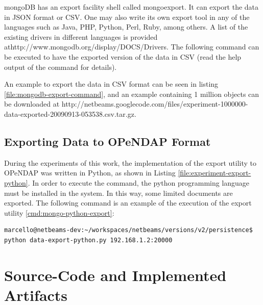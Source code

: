 mongoDB has an export facility shell called mongoexport. It can export the data
in JSON format or CSV. One may also write its own export tool in any of the
languages such as Java, PHP, Python, Perl, Ruby, among others. A list of the
existing drivers in different languages is provided
athttp://www.mongodb.org/display/DOCS/Drivers. The following command can be
executed to have the exported version of the data in CSV (read the help output
of the command for details).

An example to export the data in CSV format can be seen in listing
\ref{file:mongodb-export-command}, and an example containing 1 million objects
can be downloaded at
http://netbeams.googlecode.com/files/experiment-1000000-data-exported-20090913-053538.csv.tar.gz.

\subsection{Exporting Data to OPeNDAP Format}

During the experiments of this work, the implementation of the export utility
to OPeNDAP was written in Python, as shown in Listing
\ref{file:experiment-export-python}. In order to execute the
command, the python programming language \cite{python} must be installed in the
system. In this way, some limited documents are exported. The following command
is an example of the execution of the export utility
\ref{cmd:mongo-python-export}:

\lstset{label=cmd:mongo-python-export,caption=Query Element with specific
projection limiting the result set size}
\begin{lstlisting}
marcello@netbeams-dev:~/workspaces/netbeams/versions/v2/persistence$ python data-export-python.py 192.168.1.2:20000
\end{lstlisting}

\section{Source-Code and Implemented Artifacts}






